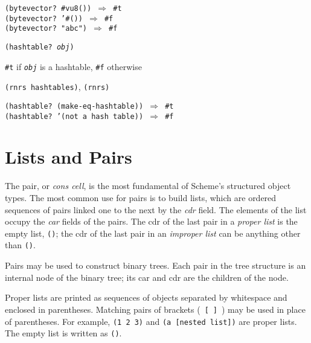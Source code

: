 \begin{alltt}
(bytevector? \#{}vu8()) \(\Rightarrow\) \#{}t
(bytevector? '\#{}()) \(\Rightarrow\) \#{}f
(bytevector? "abc") \(\Rightarrow\) \#{}f
\end{alltt}

\begin{description}

\label{objects_s25}\item[procedure] \texttt{(hashtable? \textit{obj})}



\item[returns] \texttt{\#{}t} if \texttt{\textit{obj}} is a hashtable, \texttt{\#{}f} otherwise


\item[libraries] \texttt{(rnrs hashtables)}, \texttt{(rnrs)}
\end{description}


\begin{alltt}
(hashtable? (make-eq-hashtable)) \(\Rightarrow\) \#{}t
(hashtable? '(not a hash table)) \(\Rightarrow\) \#{}f
\end{alltt}

\section{\label{objects_g109}\label{objects_h3}Lists and Pairs\label{objects_SECTPAIRS}}



\label{objects_s26}The pair, or \label{objects_s27}\textit{cons cell}, is the most fundamental of Scheme's
structured object types.
The most common use for pairs is to build \label{objects_s28}lists, which are
ordered sequences of pairs linked one to the next by the
\label{objects_s29}\textit{cdr} field.
The elements of the list occupy the \label{objects_s30}\textit{car}
fields of the pairs.
The cdr of the last pair in a \label{objects_s31}\textit{proper list} is
the empty list, \texttt{()}; the cdr of the last pair in an
\label{objects_s32}\textit{improper list} can be anything other than
\texttt{()}.


Pairs may be used to construct \label{objects_s33}binary trees.
Each pair in the tree structure is an internal node of the binary tree;
its car and cdr are the children of the node.


Proper lists are printed as sequences of objects separated by whitespace
and enclosed in parentheses.
Matching pairs of \label{objects_s34}brackets
( \texttt{[} \texttt{]} ) may be used in place of parentheses.
For example, \texttt{(1 2 3)} and \texttt{(a [nested list])} are proper lists.
The empty list is written as \texttt{()}.


